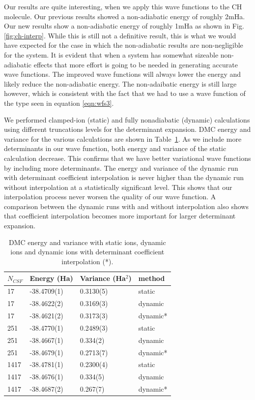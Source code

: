 \documentclass[aip,jcp,numerical,reprint]{revtex4-1}
\begin{document}
Our results are quite interesting, when we apply this wave functions to the CH molecule.  Our previous results showed a non-adiabatic energy of roughly 2mHa. Our new results show a non-adiabatic energy of roughly 1mHa as shown in Fig.\ref{fig:ch-interp}.  While this is still not a definitive result, this is what we would have expected for the case in which the non-adiabatic results are non-negligible for the system.  It is evident that when a system has somewhat sizeable non-adiabatic effects that more effort is going to be needed in generating accurate wave functions.  The improved wave functions will always lower the energy and likely reduce the non-adiabatic energy.  The non-adaibatic energy is still large however, which is consistent with the fact that we had to use a wave function of the type seen in equation \eqref{eqn:wfs3}.

We performed clamped-ion (static) and fully nonadiabatic (dynamic) calculations using different truncations levels for the determinant expansion. DMC energy and variance for the various calculations are shown in Table~\ref{tab:energy}. As we include more determinants in our wave function, both energy and variance of the static calculation decrease. This confirms that we have better variational wave functions by including more determinants. The energy and variance of the dynamic run with determinant coefficient interpolation is never higher than the dynamic run without interpolation at a statistically significant level. This shows that our interpolation process never worsen the quality of our wave function. A comparison between the dynamic runs with and without interpolation also shows that coefficient interpolation becomes more important for larger determinant expansion.

\begin{table}[h]
\begin{tabular}{llll}
\hline\hline
$N_{CSF}$ & Energy (Ha) & Variance (Ha$^2$) & method \\
\hline
17   & -38.4709(1) &  0.3130(5) &    static \\
17   & -38.4622(2) &  0.3169(3) &   dynamic \\
17   & -38.4621(2) &  0.3173(3) &  dynamic* \\
251  & -38.4770(1)&  0.2489(3) &    static \\
251  & -38.4667(1) &  0.334(2)~  &   dynamic \\
251  & -38.4679(1) &  0.2713(7) &  dynamic* \\
1417 & -38.4781(1) &  0.2300(4) &    static \\
1417 & -38.4676(1) &  0.334(5)~  &   dynamic \\
1417 & -38.4687(2) &  0.267(7)~  &  dynamic* \\
\hline\hline
\end{tabular}
\caption{DMC energy and variance with static ions, dynamic ions and dynamic ions with determinant coefficient interpolation (*).\label{tab:energy}}
\end{table}
\end{document}
